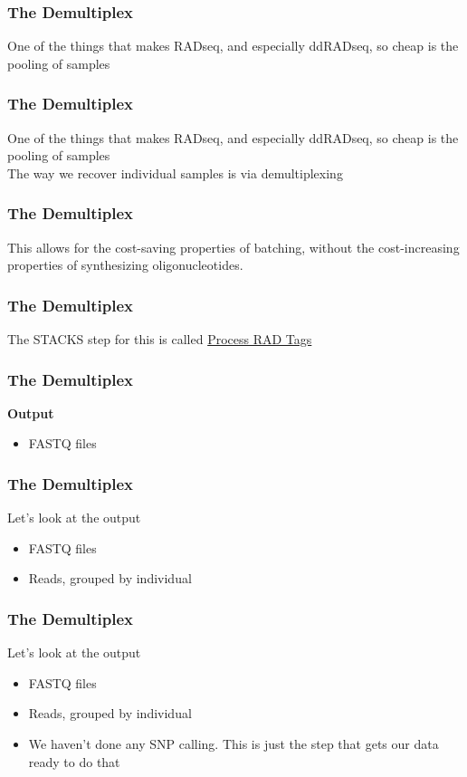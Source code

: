 \documentclass{beamer}
\begin{document}
\begin{frame}
\frametitle{The Demultiplex}
One of the things that makes RADseq, and especially ddRADseq, so cheap is the pooling of samples
\end{frame}

\begin{frame}
\frametitle{The Demultiplex}
One of the things that makes RADseq, and especially ddRADseq, so cheap is the pooling of samples \\
The way we recover individual samples is via demultiplexing
\end{frame}

\begin{frame}
\frametitle{The Demultiplex}
This allows for the cost-saving properties of batching, without the cost-increasing properties of synthesizing oligonucleotides. 
\end{frame}

\begin{frame}
\frametitle{The Demultiplex}
The STACKS step for this is called \href{http://catchenlab.life.illinois.edu/stacks/comp/process_radtags.php}{Process RAD Tags} 
\end{frame}

\begin{frame}
\frametitle{The Demultiplex}
\textbf{Output}
\begin{itemize}
\item FASTQ files
\end{itemize}
\end{frame}

\begin{frame}
\frametitle{The Demultiplex}
Let's look at the output
\begin{itemize}
\item FASTQ files
\item Reads, grouped by individual
\end{itemize}
\end{frame}

\begin{frame}
\frametitle{The Demultiplex}
Let's look at the output
\begin{itemize}
\item FASTQ files
\item Reads, grouped by individual
\item We haven't done any SNP calling. This is just the step that gets our data ready to do that
\end{itemize}
\end{frame}
\end{document}
